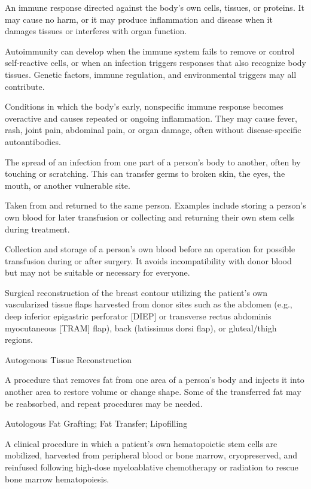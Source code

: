  An immune response directed against the body's own cells, tissues, or proteins. It may cause no harm, or it may produce inflammation and disease when it damages tissues or interferes with organ function.

 Autoimmunity can develop when the immune system fails to remove or control self-reactive cells, or when an infection triggers responses that also recognize body tissues. Genetic factors, immune regulation, and environmental triggers may all contribute.

 Conditions in which the body's early, nonspecific immune response becomes overactive and causes repeated or ongoing inflammation. They may cause fever, rash, joint pain, abdominal pain, or organ damage, often without disease-specific autoantibodies.

 The spread of an infection from one part of a person's body to another, often by touching or scratching. This can transfer germs to broken skin, the eyes, the mouth, or another vulnerable site.

 Taken from and returned to the same person. Examples include storing a person's own blood for later transfusion or collecting and returning their own stem cells during treatment.

 Collection and storage of a person's own blood before an operation for possible transfusion during or after surgery. It avoids incompatibility with donor blood but may not be suitable or necessary for everyone.

 Surgical reconstruction of the breast contour utilizing the patient's own vascularized tissue flaps harvested from donor sites such as the abdomen (e.g., deep inferior epigastric perforator [DIEP] or transverse rectus abdominis myocutaneous [TRAM] flap), back (latissimus dorsi flap), or gluteal/thigh regions.

\synonyms
Autogenous Tissue Reconstruction

 A procedure that removes fat from one area of a person's body and injects it into another area to restore volume or change shape. Some of the transferred fat may be reabsorbed, and repeat procedures may be needed.

\synonyms
Autologous Fat Grafting; Fat Transfer; Lipofilling

 A clinical procedure in which a patient's own hematopoietic stem cells are mobilized, harvested from peripheral blood or bone marrow, cryopreserved, and reinfused following high-dose myeloablative chemotherapy or radiation to rescue bone marrow hematopoiesis.

